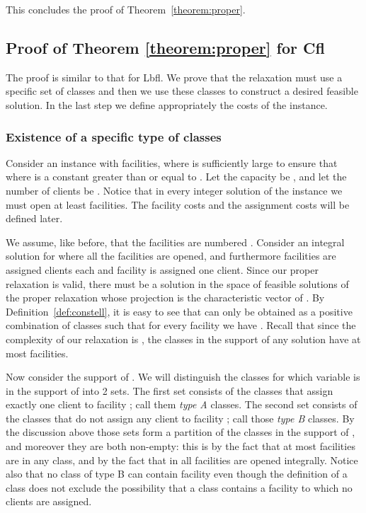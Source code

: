 \documentclass[11pt]{article}
\newcommand{\lbfl}{{\sc Lbfl}}
\newcommand{\cfl}{{\sc Cfl}}
\begin{document}
This concludes the proof of Theorem~\ref{theorem:proper}. 




\subsection{Proof of Theorem \ref{theorem:proper} for \cfl\ } 
\label{sec:proof_theorem_p2}

The proof is similar to that for \lbfl. 
We prove that the relaxation must use 
a specific set of classes and then we use these classes to construct a
desired feasible solution. In the last step we 
 define appropriately  the costs of the instance. 

\subsubsection{Existence of a specific type of classes}

Consider
an instance  with  facilities, where  is
sufficiently large to ensure  that   where
  is a
constant greater than or equal to  . Let the capacity be , and let
the number of  clients be . Notice that in every integer solution of the instance
 we must open  at least  facilities. The  facility costs  and the assignment  costs will  be defined
later.  

 We  assume, like before, that  the  facilities are  numbered
. 
Consider  an  integral  solution    for    where  all the
facilities  are opened, and furthermore 
facilities   are assigned  clients each 
and facility  is assigned one client. 
Since our proper  relaxation is valid, there must be a solution  in the  space of
feasible solutions of the proper relaxation whose  projection is the characteristic 
vector of .  
By Definition~\ref{def:constell},
it is easy to see that  can only be obtained as a 
positive combination of classes  such that for
every    facility       we   have    .  Recall  that  since  the  complexity  of  our
relaxation is , the classes in the support of any solution 
have at most 
facilities. 

Now consider the support  of . We will distinguish the classes  for
which variable  is in the support of  into 2 sets. The first set consists 
of the classes that assign exactly one client to facility ; call them \emph{type A} classes.
The second set  consists  of the classes that do not assign any client to facility 
; call those \emph{type B} classes. By the discussion above those sets form a
partition of the classes in the support of , and moreover they are both non-empty: this is
 by the fact that at most   facilities are in any class, and by the fact
 that in  all  
facilities are opened integrally. Notice also that no  class
of type B can contain facility  even though the definition of a class does not
exclude the possibility that a class contains a facility to which no clients are
assigned. 
\end{document}
